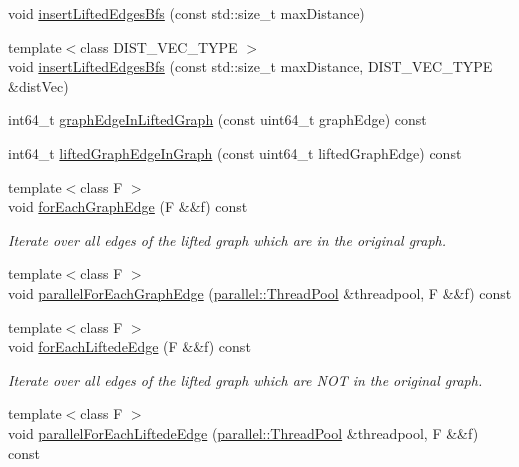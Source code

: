 \begin{DoxyCompactItemize}
\item 
void \hyperlink{classnifty_1_1graph_1_1optimization_1_1lifted__multicut_1_1LiftedMulticutObjective_a09d12a39203f6c243b1e82d5dd36fa98}{insert\+Lifted\+Edges\+Bfs} (const std\+::size\+\_\+t max\+Distance)
\item 
{\footnotesize template$<$class D\+I\+S\+T\+\_\+\+V\+E\+C\+\_\+\+T\+Y\+P\+E $>$ }\\void \hyperlink{classnifty_1_1graph_1_1optimization_1_1lifted__multicut_1_1LiftedMulticutObjective_afeb80b6d777d1e9a9c3e37277be019e6}{insert\+Lifted\+Edges\+Bfs} (const std\+::size\+\_\+t max\+Distance, D\+I\+S\+T\+\_\+\+V\+E\+C\+\_\+\+T\+Y\+P\+E \&dist\+Vec)
\item 
int64\+\_\+t \hyperlink{classnifty_1_1graph_1_1optimization_1_1lifted__multicut_1_1LiftedMulticutObjective_ab94ba269b1a10d6228ba44d92f46a9e8}{graph\+Edge\+In\+Lifted\+Graph} (const uint64\+\_\+t graph\+Edge) const 
\item 
int64\+\_\+t \hyperlink{classnifty_1_1graph_1_1optimization_1_1lifted__multicut_1_1LiftedMulticutObjective_a42f7a79af4f43655175da7f366951f7c}{lifted\+Graph\+Edge\+In\+Graph} (const uint64\+\_\+t lifted\+Graph\+Edge) const 
\item 
{\footnotesize template$<$class F $>$ }\\void \hyperlink{classnifty_1_1graph_1_1optimization_1_1lifted__multicut_1_1LiftedMulticutObjective_af22ccb535f902c4b8400b4d4debc192e}{for\+Each\+Graph\+Edge} (F \&\&f) const 
\begin{DoxyCompactList}\small\item\em Iterate over all edges of the lifted graph which are in the original graph. \end{DoxyCompactList}\item 
{\footnotesize template$<$class F $>$ }\\void \hyperlink{classnifty_1_1graph_1_1optimization_1_1lifted__multicut_1_1LiftedMulticutObjective_a6cd9e60fb6aea9cc264af6d8327aa556}{parallel\+For\+Each\+Graph\+Edge} (\hyperlink{classnifty_1_1parallel_1_1ThreadPool}{parallel\+::\+Thread\+Pool} \&threadpool, F \&\&f) const 
\item 
{\footnotesize template$<$class F $>$ }\\void \hyperlink{classnifty_1_1graph_1_1optimization_1_1lifted__multicut_1_1LiftedMulticutObjective_acd0faa815d359406af0dff58d7d94205}{for\+Each\+Liftede\+Edge} (F \&\&f) const 
\begin{DoxyCompactList}\small\item\em Iterate over all edges of the lifted graph which are N\+O\+T in the original graph. \end{DoxyCompactList}\item 
{\footnotesize template$<$class F $>$ }\\void \hyperlink{classnifty_1_1graph_1_1optimization_1_1lifted__multicut_1_1LiftedMulticutObjective_a8342d29e2d6a273369255fcbc3d3247b}{parallel\+For\+Each\+Liftede\+Edge} (\hyperlink{classnifty_1_1parallel_1_1ThreadPool}{parallel\+::\+Thread\+Pool} \&threadpool, F \&\&f) const 
\end{DoxyCompactItemize}
